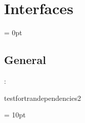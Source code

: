 
\section{Interfaces} 


\parskip = 0pt

\vspace{3mm} \subsection*{General}

: 

testfortrandependencies2
\vspace{2mm}

\vspace{5mm}\parskip = 10pt 

